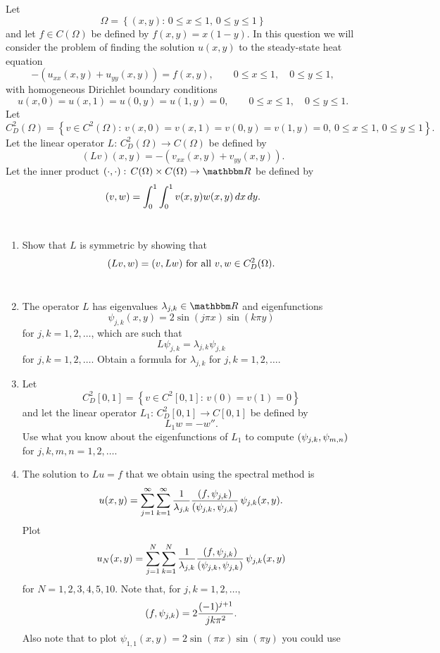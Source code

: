 
Let
\[
\Omega=\left\{(x,y):\,0\le x\le 1,\,0\le y\le 1\right\}
\]
and let $f\in  C(\Omega)$ be defined by $f(x,y) = x(1-y)$. In this question we will consider the problem of finding the solution $u(x,y)$ to the steady-state heat equation
\[ 
-(u_{xx}(x,y) +u_{yy}(x,y)) = f(x,y), \qquad 0\le x \le 1, \quad 0\le y\le 1,
\]
with homogeneous Dirichlet boundary conditions
\[
u(x,0)=u(x,1)=u(0,y)=u(1,y)=0, \qquad 0\le x \le 1, \quad 0\le y\le 1.
\]
Let
\[
C^2_D(\Omega)=\left\{v\in C^2(\Omega):\,v(x,0)=v(x,1)=v(0,y)=v(1,y)=0,\,0\le x\le 1,\,0\le y\le 1\right\}.
\]
Let the linear operator $L:\,C^2_D(\Omega)\rightarrow C(\Omega)$ be defined by
\[
\left(L v\right)(x,y) = -\left(v_{xx}(x,y) + v_{yy}(x,y)\right).
\]
Let the inner product $\ip{\cdot,\cdot}:\,C(\Omega)\times C(\Omega)\rightarrow \R$ be defined by
\[
(v,w) =\int_0^1 \int_0^1 v(x,y) w(x,y) \, dx\,dy.
\]
\\
\begin{enumerate}
\item Show that $L$ is symmetric by showing that
\[
(Lv,w)=(v,Lw)\mbox{ for all }v,w\in C^2_D(\Omega).
\]
\\
\item The operator $L$ has eigenvalues $\lambda_{j,k}\in\R$ and eigenfunctions
\[
\psi_{j,k}(x,y) = 2 \sin(j \pi x) \sin(k \pi y)
\]
for $j,k = 1,2,\ldots$, which are such that
\[
L\psi_{j,k}=\lambda_{j,k}\psi_{j,k}
\]
for $j,k = 1,2,\ldots$. Obtain a formula for $\lambda_{j,k}$ for $j,k = 1,2,\ldots$.
\\
\item Let
\[
C^2_D[0,1]=\left\{v\in C^2[0,1]:\,v(0)=v(1)=0\right\}
\]
and let the linear operator $L_1:\,C^2_D[0,1]\rightarrow C[0,1]$ be defined by
\[
L_1w = -w''.
\]
Use what you know about the eigenfunctions of $L_1$ to compute $(\psi_{j,k},\psi_{m,n})$ for $j,k,m,n = 1,2,\ldots$.
\\
\item The solution to $Lu=f$ that we obtain using the spectral method is
\[
u(x,y) = \sum_{j=1}^\infty \sum_{k=1}^\infty{1\over \lambda_{j,k}} {(f,\psi_{j,k}) \over (\psi_{j,k},\psi_{j,k})}\, \psi_{j,k}(x,y).
\]
Plot
\[
u_N(x,y)= \sum_{j=1}^N \sum_{k=1}^N{1\over \lambda_{j,k}} {(f,\psi_{j,k}) \over (\psi_{j,k},\psi_{j,k})}\, \psi_{j,k}(x,y)
\]
for $N=1,2,3,4,5,10$. Note that, for $j,k = 1,2,\ldots$,
\[
(f, \psi_{j,k})=2{(-1)^{j+1} \over jk\pi^2}.
\]
Also note that to plot $\psi_{1,1}(x,y) = 2 \sin(\pi x)\sin(\pi y)$ you could use



\end{enumerate}




